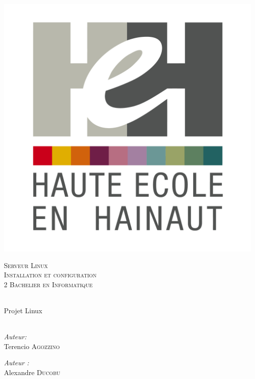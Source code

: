 \begin{center}
  \includegraphics[scale=0.12]{textures/logo/heh.pdf}

  \vspace{1cm}

  \textsc{\LARGE Serveur Linux} \\ [0.5cm]
  \textsc{\Large Installation et configuration} \\ [0.5cm]

  \textsc{\large 2 Bachelier en Informatique} \\ [0.2cm]

  \begingroup
   \selectfont 

  \HRule \\ [0.4cm] {
    \huge Projet Linux \\ [0.2cm] 
  }
  \HRule \\ [1.3cm]
  \endgroup

  \begin{minipage}[t]{0.4 \textwidth} 
    \begin{flushleft} 
      \large \emph{Auteur:} \\ 
      Terencio \textsc{Agozzino}
    \end{flushleft} 
  \end{minipage}
  \begin{minipage}[t]{0.4 \textwidth}
    \begin{flushright} 
      \large \emph{Auteur :} \\ 
      Alexandre \textsc{Ducobu}
    \end{flushright} 
  \end{minipage}


\end{center}
